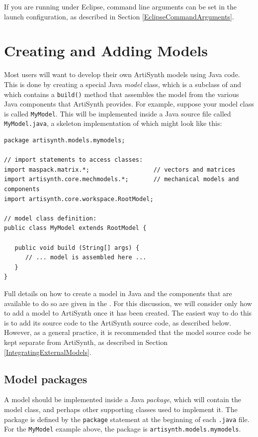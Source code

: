 If you are running under Eclipse, command line arguments can be set in
the launch configuration, as described in
Section \ref{EclipseCommandArguments}.

\section{Creating and Adding Models}
\label{AddingModels}

Most users will want to develop their own ArtiSynth models using Java
code. This is done by creating a special Java {\it model} class, which
is a subclass of
 and which contains a
{\tt build()} method that assembles the model from the various Java
components that ArtiSynth provides. For example, suppose your model
class is called {\tt MyModel}. This will be implemented inside a Java
source file called {\tt MyModel.java}, a skeleton implementation of
which might look like this:
%
\begin{lstlisting}[]
package artisynth.models.mymodels;

// import statements to access classes:
import maspack.matrix.*;                  // vectors and matrices
import artisynth.core.mechmodels.*;       // mechanical models and components
import artisynth.core.workspace.RootModel;

// model class definition:
public class MyModel extends RootModel {

   public void build (String[] args) {
      // ... model is assembled here ...
   }
}
\end{lstlisting}
%
Full details on how to create a model in Java and the components that
are available to do so are given in
the\pdfbreak
{}. For this
discussion, we will consider only how to add a model to ArtiSynth once
it has been created. The easiest way to do this is to add its source
code to the ArtiSynth source code, as described below. However, as
a general practice, it is recommended that the model source code
be kept separate from ArtiSynth, as described in
Section \ref{IntegratingExternalModels}.

\subsection{Model packages}

A model should be implemented inside a Java {\it package}, which will
contain the model class, and perhaps other supporting classes used to
implement it. The package is defined by the {\tt package} statement at
the beginning of each {\tt .java} file. For the {\tt MyModel} example
above, the package is {\tt artisynth.models.mymodels}.

